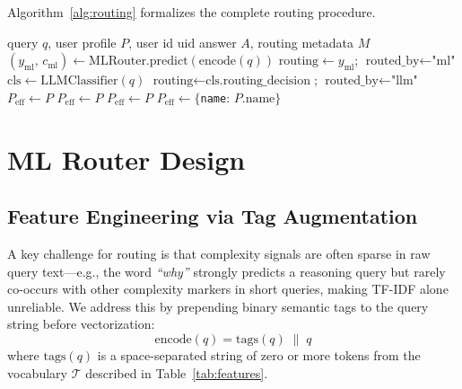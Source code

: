 \documentclass{article}
\newcommand{\system}{\textsc{CascadeRoute}}
\newcommand{\smallmdl}{GPT-4o-mini}
\begin{document}
Algorithm~\ref{alg:routing} formalizes the complete routing procedure.

\begin{algorithm}[t]
\caption{\system{} Query Routing}
\label{alg:routing}
\begin{algorithmic}[1]
\Require query $q$, user profile $P$, user id $\text{uid}$
\Ensure answer $A$, routing metadata $M$
    \State \Return {}
\EndIf
\State $(y_\text{ml},\, c_\text{ml}) \leftarrow \text{MLRouter.predict}(\text{encode}(q))$
 
    \State $\text{routing} \leftarrow y_\text{ml}$;\; $\text{routed\_by} \leftarrow \text{"ml"}$
\Else
    \State $\text{cls} \leftarrow \text{LLMClassifier}(q)$ \Comment{JSON mode, \smallmdl{}}
    \State $\text{routing} \leftarrow \text{cls.routing\_decision}$;\; $\text{routed\_by} \leftarrow \text{"llm"}$
\EndIf
{}
    \State $P_\text{eff} \leftarrow P$ 
    \State $P_\text{eff} \leftarrow P$
    \State $P_\text{eff} \leftarrow P$ 
\Else
    \State $P_\text{eff} \leftarrow \{$\texttt{name}: $P.\text{name}\}$ 
\EndIf
\State \Return {}
\end{algorithmic}
\end{algorithm}

\section{ML Router Design}
\label{sec:ml_router}

\subsection{Feature Engineering via Tag Augmentation}
\label{sec:features}

A key challenge for routing is that complexity signals are often sparse in
raw query text---e.g., the word \emph{``why''} strongly predicts a reasoning
query but rarely co-occurs with other complexity markers in short queries,
making TF-IDF alone unreliable. We address this by prepending binary
semantic tags to the query string before vectorization:
\begin{equation}
    \text{encode}(q) = \text{tags}(q) \;\|\; q
\end{equation}
where $\text{tags}(q)$ is a space-separated string of zero or more tokens
from the vocabulary $\mathcal{T}$ described in Table~\ref{tab:features}.
\end{document}
